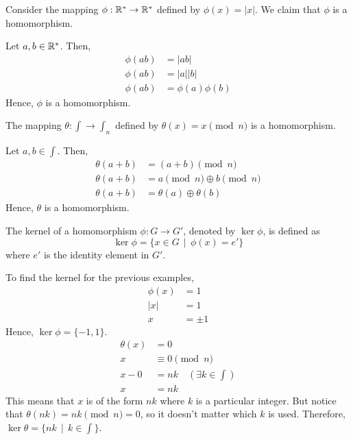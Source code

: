     \begin{example}
        Consider the mapping \(\phi : \mathbb{R}^* \to \mathbb{R}^*\) defined by \(\phi(x) = |x|\). We claim that \(\phi\) is a homomorphism. 

        Let \(a,b\in\mathbb{R}^*\). Then,
        \begin{align*}
            \phi(ab) &= |ab| \\
            \phi(ab) &= |a||b| \\
            \phi(ab) &= \phi(a)\phi(b)
        \end{align*}
        Hence, \(\phi\) is a homomorphism.
    \end{example}

    \begin{example}
        The mapping \(\theta : \int \to \int_n\) defined by \(\theta(x) = x \pmod{n}\) is a homomorphism.

        Let \(a,b\in\int\). Then,
        \begin{align*}
            \theta(a + b) &= (a + b) \pmod{n} \\
            \theta(a + b) &= a \pmod{n} \oplus b \pmod{n} \\
            \theta(a + b) &= \theta(a) \oplus \theta(b)
        \end{align*}
        Hence, \(\theta\) is a homomorphism.
    \end{example}

    \begin{dfn}
        The kernel of a homomorphism \(\phi : G \to G'\), denoted by \(\ker\phi\), is defined as \[\ker\phi = \{x\in G \,\mid\, \phi(x) = e'\}\]
        where \(e'\) is the identity element in \(G'\).
    \end{dfn}

    \begin{example}
        To find the kernel for the previous examples,
        \begin{align*}
            \phi(x) &= 1 \\
            |x| &= 1 \\
            x &= \pm 1
        \end{align*}
        Hence, \(\ker\phi = \{-1, 1\}\).
        \begin{align*}
            \theta(x) &= 0 \\
            x &\equiv 0 \pmod{n} \\
            x - 0 &= nk \quad(\exists k\in\int) \\
            x &= nk
        \end{align*}
        This means that \(x\) is of the form \(nk\) where \(k\) is a particular integer. But notice that \(\theta(nk) = nk \pmod{n} = 0\), so it doesn't matter which \(k\) is used. Therefore, \(\ker\theta = \{nk\,\mid\, k\in\int\}\).
    \end{example}
